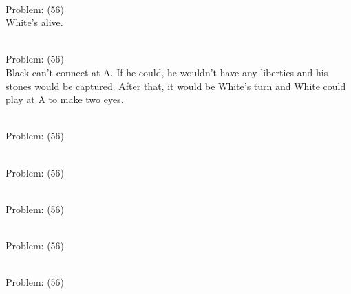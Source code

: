 \documentclass[11pt]{article}
\begin{document}
\begin{minipage}[t]{0.5\textwidth}
  {\centering
  
\\
Problem: (56)\\
White's alive.\\
  }
\end{minipage}
\begin{minipage}[t]{0.5\textwidth}
  {\centering
  
\\
Problem: (56)\\
Black can't connect at A. If he could, he wouldn't have any liberties and his stones would be captured. After that, it would be White’s turn and White could play at A to make two eyes.\\
  }
\end{minipage}
\begin{minipage}[t]{0.5\textwidth}
  {\centering
  
\\
Problem: (56)\\
  }
\end{minipage}
\begin{minipage}[t]{0.5\textwidth}
  {\centering
  
\\
Problem: (56)\\
  }
\end{minipage}
\begin{minipage}[t]{0.5\textwidth}
  {\centering
  
\\
Problem: (56)\\
  }
\end{minipage}
\begin{minipage}[t]{0.5\textwidth}
  {\centering
  
\\
Problem: (56)\\
  }
\end{minipage}
\begin{minipage}[t]{0.5\textwidth}
  {\centering
  
\\
Problem: (56)\\
  }
\end{minipage}
\end{document}
